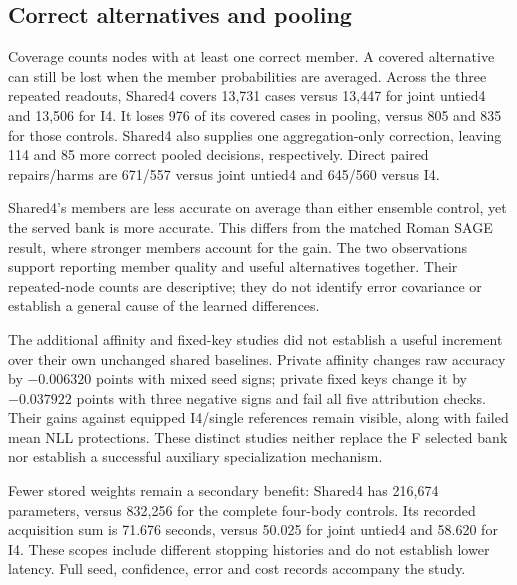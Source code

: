 \subsection{Correct alternatives and pooling}
Coverage counts nodes with at least one correct member. A covered alternative can still be lost when the member probabilities are averaged. Across the three repeated readouts, Shared4 covers 13,731 cases versus 13,447 for joint untied4 and 13,506 for I4. It loses 976 of its covered cases in pooling, versus 805 and 835 for those controls. Shared4 also supplies one aggregation-only correction, leaving 114 and 85 more correct pooled decisions, respectively. Direct paired repairs/harms are 671/557 versus joint untied4 and 645/560 versus I4.

Shared4's members are less accurate on average than either ensemble control, yet the served bank is more accurate. This differs from the matched Roman SAGE result, where stronger members account for the gain. The two observations support reporting member quality and useful alternatives together. Their repeated-node counts are descriptive; they do not identify error covariance or establish a general cause of the learned differences.

The additional affinity and fixed-key studies did not establish a useful increment over their own unchanged shared baselines. Private affinity changes raw accuracy by $-0.006320$ points with mixed seed signs; private fixed keys change it by $-0.037922$ points with three negative signs and fail all five attribution checks. Their gains against equipped I4/single references remain visible, along with failed mean NLL protections. These distinct studies neither replace the F selected bank nor establish a successful auxiliary specialization mechanism.

Fewer stored weights remain a secondary benefit: Shared4 has 216,674 parameters, versus 832,256 for the complete four-body controls. Its recorded acquisition sum is 71.676 seconds, versus 50.025 for joint untied4 and 58.620 for I4. These scopes include different stopping histories and do not establish lower latency. Full seed, confidence, error and cost records accompany the study.

